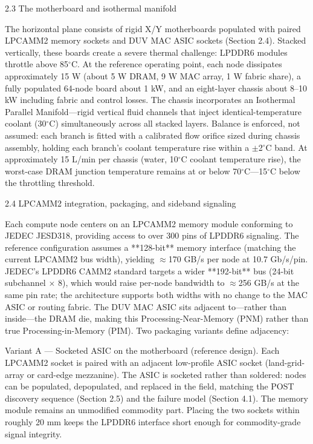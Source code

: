 \documentclass[10pt,twocolumn]{article}
\begin{document}
2.3 The motherboard and isothermal manifold

The horizontal plane consists of rigid X/Y motherboards populated with paired LPCAMM2 memory sockets and DUV MAC ASIC sockets (Section 2.4). Stacked vertically, these boards create a severe thermal challenge: LPDDR6 modules throttle above 85$^\circ$C. At the reference operating point, each node dissipates approximately 15 W (about 5 W DRAM, 9 W MAC array, 1 W fabric share), a fully populated 64-node board about 1 kW, and an eight-layer chassis about 8--10 kW including fabric and control losses. The chassis incorporates an Isothermal Parallel Manifold---rigid vertical fluid channels that inject identical-temperature coolant (30$^\circ$C) simultaneously across all stacked layers. Balance is enforced, not assumed: each branch is fitted with a calibrated flow orifice sized during chassis assembly, holding each branch's coolant temperature rise within a $\pm$2$^\circ$C band. At approximately 15 L/min per chassis (water, 10$^\circ$C coolant temperature rise), the worst-case DRAM junction temperature remains at or below 70$^\circ$C---15$^\circ$C below the throttling threshold.

2.4 LPCAMM2 integration, packaging, and sideband signaling

Each compute node centers on an LPCAMM2 memory module conforming to JEDEC JESD318\cite{16}, providing access to over 300 pins of LPDDR6 signaling\cite{17}. The reference configuration assumes a **128-bit** memory interface (matching the current LPCAMM2 bus width), yielding $\approx$170 GB/s per node at 10.7 Gb/s/pin. JEDEC's LPDDR6 CAMM2 standard targets a wider **192-bit** bus (24-bit subchannel $\times$ 8), which would raise per-node bandwidth to $\approx$256 GB/s at the same pin rate; the architecture supports both widths with no change to the MAC ASIC or routing fabric. The DUV MAC ASIC sits adjacent to---rather than inside---the DRAM die, making this Processing-Near-Memory (PNM) rather than true Processing-in-Memory (PIM). Two packaging variants define adjacency:

Variant A --- Socketed ASIC on the motherboard (reference design). Each LPCAMM2 socket is paired with an adjacent low-profile ASIC socket (land-grid-array or card-edge mezzanine). The ASIC is socketed rather than soldered: nodes can be populated, depopulated, and replaced in the field, matching the POST discovery sequence (Section 2.5) and the failure model (Section 4.1). The memory module remains an unmodified commodity part. Placing the two sockets within roughly 20 mm keeps the LPDDR6 interface short enough for commodity-grade signal integrity.
\end{document}
